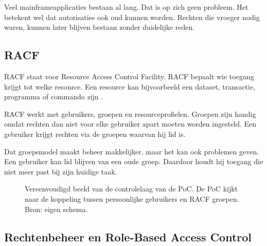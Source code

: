 Veel mainframeapplicaties bestaan al lang. Dat is op zich geen probleem. Het betekent wel dat autorisaties ook oud kunnen worden. Rechten die vroeger nodig waren, kunnen later blijven bestaan zonder duidelijke reden.

\subsection*{RACF}

RACF staat voor Resource Access Control Facility. RACF bepaalt wie toegang krijgt tot welke resource. Een resource kan bijvoorbeeld een dataset, transactie, programma of commando zijn \autocite{Singh2014,IBMRACFAdmin2023}.

RACF werkt met gebruikers, groepen en resourceprofielen. Groepen zijn handig omdat rechten dan niet voor elke gebruiker apart moeten worden ingesteld. Een gebruiker krijgt rechten via de groepen waarvan hij lid is.

Dat groepsmodel maakt beheer makkelijker, maar het kan ook problemen geven. Een gebruiker kan lid blijven van een oude groep. Daardoor houdt hij toegang die niet meer past bij zijn huidige taak.

\begin{figure}[htbp]
	\centering
	\caption[RACF-groepen als controlelaag]{Vereenvoudigd beeld van de controlelaag van de PoC. De PoC kijkt naar de koppeling tussen persoonlijke gebruikers en RACF groepen. Bron: eigen schema.}
	\label{fig:racf-groepen-controlelaag}
\end{figure}

\subsection*{Rechtenbeheer en Role-Based Access Control}

